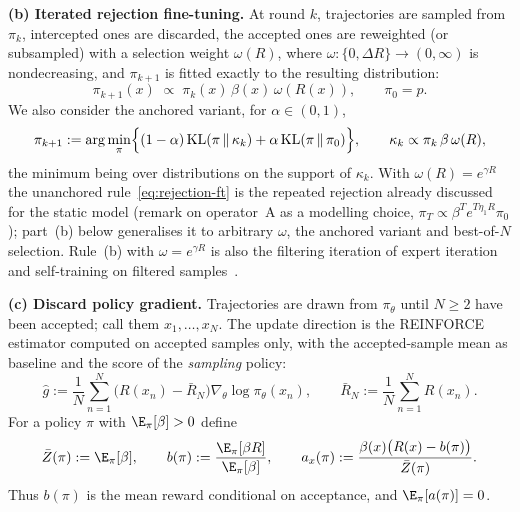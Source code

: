 \smallskip\noindent\textbf{(b) Iterated rejection fine-tuning.}
At round $k$, trajectories are sampled from $\pi_k$, intercepted ones are
discarded, the accepted ones are reweighted (or subsampled) with a
selection weight $\omega(R)$, where $\omega:\{0,\Delta R\}\to(0,\infty)$ is
nondecreasing, and $\pi_{k+1}$ is fitted exactly to the resulting
distribution:
\begin{equation}\label{eq:rejection-ft}
\pi_{k+1}(x)\;\propto\;\pi_k(x)\,\beta(x)\,\omega(R(x)),\qquad \pi_0=p .
\end{equation}
We also consider the anchored variant, for $\alpha\in(0,1)$,
\begin{equation}\label{eq:rejection-ft-anchored}
\pi_{k+1}:=\arg\min_{\pi}\Bigl\{(1-\alpha)\,\mathrm{KL}(\pi\,\|\,\kappa_k)
+\alpha\,\mathrm{KL}(\pi\,\|\,\pi_0)\Bigr\},
\qquad \kappa_k\propto\pi_k\,\beta\,\omega(R),
\end{equation}
the minimum being over distributions on the support of $\kappa_k$. With $\omega(R)=e^{\gamma R}$ the unanchored rule~\eqref{eq:rejection-ft} is the repeated rejection already discussed for the static model (remark on operator~A as a modelling choice, $\pi_T\propto\beta^T e^{T\eta_1R}\pi_0$); part~(b) below generalises it to arbitrary $\omega$, the anchored variant and best-of-$N$ selection. Rule~(b) with $\omega=e^{\gamma R}$ is also the filtering iteration of expert iteration and self-training on filtered samples~\cite{anthony2017,zelikman2022,dong2023raft,gulcehre2023rest}.

\smallskip\noindent\textbf{(c) Discard policy gradient.}
Trajectories are drawn from $\pi_\theta$ until $N\ge 2$ have been accepted;
call them $x_1,\dots,x_N$. The update direction is the REINFORCE estimator
computed on accepted samples only, with the accepted-sample mean as
baseline and the score of the \emph{sampling} policy:
\begin{equation}\label{eq:discard-pg-estimator}
\hat g:=\frac1N\sum_{n=1}^N\bigl(R(x_n)-\bar R_N\bigr)\nabla_\theta\log\pi_\theta(x_n),
\qquad \bar R_N:=\frac1N\sum_{n=1}^N R(x_n).
\end{equation}
For a policy $\pi$ with $\E_\pi[\beta]>0$ define
\begin{equation}\label{eq:accepted-mean}
\bar Z(\pi):=\E_\pi[\beta],\qquad
b(\pi):=\frac{\E_\pi[\beta R]}{\E_\pi[\beta]},\qquad
a_x(\pi):=\frac{\beta(x)\bigl(R(x)-b(\pi)\bigr)}{\bar Z(\pi)} .
\end{equation}
Thus $b(\pi)$ is the mean reward conditional on acceptance, and
$\E_\pi[a(\pi)]=0$.

